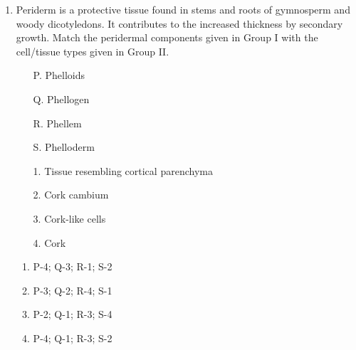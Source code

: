 \documentclass[journal,12pt,onecolumn]{IEEEtran}
\begin{document}
\begin{enumerate}
    \item \begin{minipage}{0.45\textwidth}
    Periderm is a protective tissue found in stems and roots of gymnosperm and woody dicotyledons. It contributes to the increased thickness by secondary growth. Match the peridermal components given in Group I with the cell/tissue types given in Group II.
    \begin{itemize}
        \item[P.] Phelloids
        \item[Q.] Phellogen
        \item[R.] Phellem
        \item[S.] Phelloderm
    \end{itemize}
    \end{minipage}
    \begin{minipage}{0.45\textwidth}
    \begin{itemize}
        \item[1.] Tissue resembling cortical parenchyma
        \item[2.] Cork cambium
        \item[3.] Cork-like cells
        \item[4.] Cork
    \end{itemize}
    \end{minipage}
    \begin{enumerate}
        \item P-4; Q-3; R-1; S-2
        \item P-3; Q-2; R-4; S-1
        \item P-2; Q-1; R-3; S-4
        \item P-4; Q-1; R-3; S-2
    \end{enumerate}


\end{enumerate}
\end{document}
